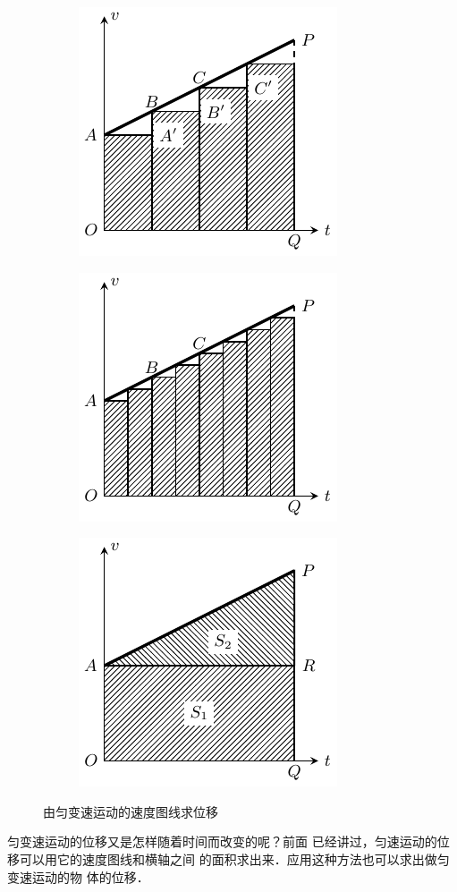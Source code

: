 \begin{figure}[htbp]
    \centering
    \begin{subfigure} {0.32\linewidth} 
		\centering
		\includegraphics{fig/A/2-19a.pdf}
		\caption{}\label{fig_A_2-19a}
	\end{subfigure}
	\hfill
	\begin{subfigure} {0.32\linewidth} 
		\centering
		\includegraphics{fig/A/2-19b.pdf} 
		\caption{}\label{fig_A_2-19b}
	\end{subfigure}
	\hfill
	\begin{subfigure} {0.32\linewidth} 
		\centering
		\includegraphics{fig/A/2-19c.pdf} 
		\caption{}\label{fig_A_2-19c}
	\end{subfigure}
    \caption{由匀变速运动的速度图线求位移}\label{fig_A_2-19}
\end{figure}
   匀变速运动的位移又是怎样随着时间而改变的呢？前面
已经讲过，匀速运动的位移可以用它的速度图线和横轴之间
的面积求出来．应用这种方法也可以求出做匀变速运动的物
体的位移．

